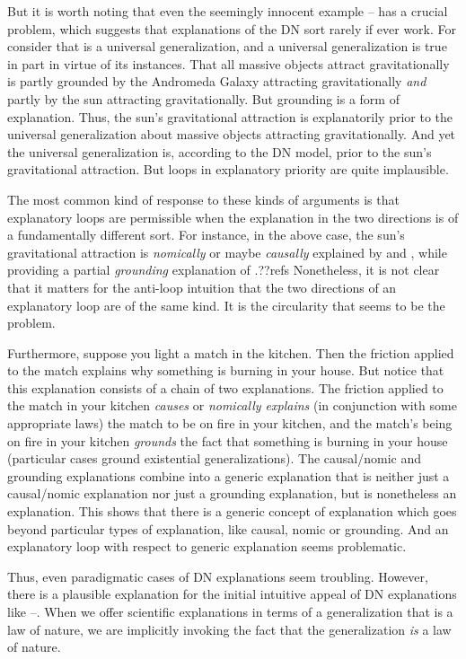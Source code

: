But it is worth noting that even the seemingly innocent example -- has a crucial problem, which suggests that
explanations of the DN sort rarely if ever work. For consider that  is a universal generalization, and a universal
generalization is true in part in virtue of its instances. That all massive objects attract gravitationally is partly grounded
by the Andromeda Galaxy attracting gravitationally \textit{and} partly by the sun attracting gravitationally. But grounding is a 
form of explanation. Thus, the sun's gravitational attraction is explanatorily prior to the universal generalization about massive
objects attracting gravitationally. And yet the universal generalization is, according to the DN model, prior to the sun's gravitational
attraction. But loops in explanatory priority are quite implausible.

The most common kind of response to these kinds of arguments is that explanatory loops are permissible when the explanation in the
two directions is of a fundamentally different sort. For instance, in the above case, the sun's gravitational attraction is 
\textit{nomically} or maybe \textit{causally} explained by  and , while providing a partial \textit{grounding} 
explanation of .??refs Nonetheless, it is not clear that it matters for the anti-loop intuition that the two directions of an 
explanatory loop are of the same kind. It is the circularity that seems to be the problem.

Furthermore, suppose you light a match in the kitchen. Then the friction applied to the match explains why something is burning in 
your house. But notice that this explanation consists of a chain of two explanations. The friction applied to the match in your 
kitchen \textit{causes} or \textit{nomically explains} (in conjunction with some appropriate laws) the match to be on fire in your kitchen, and the match's being on fire in your kitchen \textit{grounds} the 
fact that something is burning in your house (particular cases ground existential generalizations). The causal/nomic and grounding explanations
combine into a generic explanation that is neither just a causal/nomic explanation nor just a grounding explanation, but is nonetheless an 
explanation. This shows that there is a generic concept of explanation which goes beyond particular types of explanation, like 
causal, nomic or grounding. And an explanatory loop with respect to generic explanation seems problematic.

Thus, even paradigmatic cases of DN explanations seem troubling. However, there is a plausible explanation for the initial intuitive 
appeal of DN explanations like --. When we offer scientific explanations in terms of a generalization that is a 
law of nature, we are implicitly invoking the fact that the generalization \textit{is} a law of nature. 

